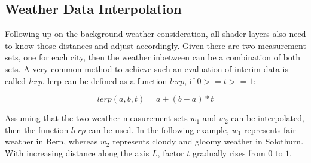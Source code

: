 \pagebreak

\subsection{Weather Data Interpolation}
\label{section:impl:layerinterpolation}
Following up on the background weather consideration, all \gls{shader} layers also need to know those distances and adjust accordingly.
Given there are two measurement sets, one for each city, then the weather inbetween can be a combination of both sets.
A very common method to achieve such an evaluation of interim data is called \emph{\gls{lerp}}.
\Gls{lerp} can be defined as a function $lerp$, if $0 >= t >= 1$: 

$$lerp(a, b, t) = a + (b - a) * t$$

\noindent
Assuming that the two weather measurement sets $w_1$ and $w_2$ can be interpolated, then the function $lerp$ can be used.
In the following example, $w_1$ represents fair weather in Bern, whereas $w_2$ represents cloudy and gloomy weather in Solothurn.
With increasing distance along the axis \color{darkercyan}$L$\color{black}, factor $t$ gradually rises from $0$ to $1$.

\begin{figure}[H]
    \centering
    \label{img:tikz:shadersetup}       
\end{figure}

